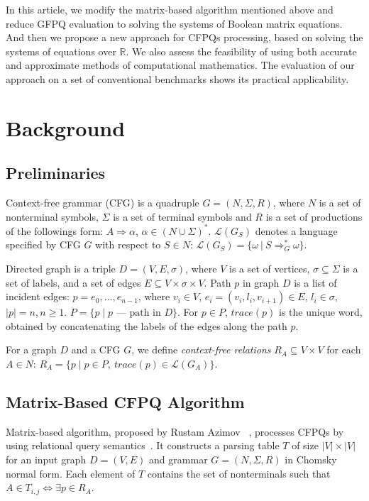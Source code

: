 \documentclass[sigconf]{acmart}
\begin{document}
In this article, we modify the matrix-based algorithm mentioned above and reduce GFPQ evaluation to solving the systems of Boolean matrix equations.
And then we propose a new approach for CFPQs processing, based on solving the systems of equations over $\mathbb{R}$.
We also assess the feasibility of using both accurate and approximate methods of computational mathematics.
The evaluation of our approach on a set of conventional benchmarks shows its practical applicability.

\section{Background}

\subsection{Preliminaries}

Context-free grammar (CFG) is a quadruple $G=(N, \Sigma, R)$, where $N$ is a set of nonterminal symbols, $\Sigma$ is a set of terminal symbols and $R$ is a set of productions of the followings form: $A \Rightarrow \alpha$, $\alpha \in (N \cup \Sigma)^*$. 
$\mathcal{L}(G_S)$ denotes a language specified by CFG $G$ with respect to $S \in N$: $\mathcal{L}(G_S) = \{\omega~|~S \Rightarrow_{G}^{*} \omega\}$.

Directed graph is a triple $D = (V,E,\sigma)$, where $V$ is a set of vertices, $\sigma \subseteq \Sigma$ is a set of labels, and a set of edges $E\subseteq V\times \sigma \times V$. 
Path $p$ in graph $D$ is a list of incident edges: 
$p = e_0,\dots,e_{n-1}$, where $v_i \in V$, $e_i=(v_i,l_i,v_{i+1}) \in E$, $l_i \in \sigma$, $|p| = n, n \geq 1$. 
$P = \{p \mid p \text{ --- path in } D\}$.
For $p \in P$, \mbox{$trace(p)$} is the unique word, obtained by concatenating the labels of the edges along the path $p$.

For a graph $D$ and a CFG $G$, we define \emph{context-free relations} \mbox{$R_A \subseteq V \times V$} for each \mbox{$A \in N$}: $R_A = \{p \mid p \in P, ~trace(p) \in \mathcal{L}(G_A)\}.$

\subsection{Matrix-Based CFPQ Algorithm}

Matrix-based algorithm, proposed by Rustam Azimov ~\cite{azimov2018context}, processes CFPQs by using relational query semantics~\cite{hellings2015querying}.
It constructs  a parsing table $T$ of size $|V| \times |V|$ for an input graph $D = (V, E)$ and grammar $G = (N,\Sigma,R)$ in Chomsky normal form.
Each element of $T$ contains the set of nonterminals such that $A \in T_{i,j} \iff \exists p \in R_A$.
\end{document}
